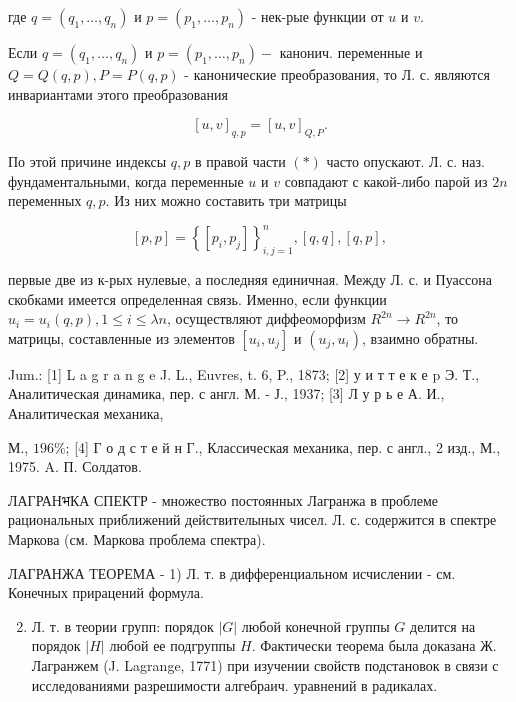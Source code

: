 \documentclass[10pt]{article}
\begin{document}
где $q=\left(q_{1}, \ldots, q_{n}\right)$ и $p=\left(p_{1}, \ldots, p_{n}\right)$ - нек-рые функции от $u$ и $v$.



Если $q=\left(q_{1}, \ldots, q_{n}\right)$ и $p=\left(p_{1}, \ldots, p_{n}\right)-$ канонич. переменные и $Q=Q(q, p), P=P(q, p)$ - канонические преобразования, то Л. с. являются инвариантами этого преобразования



\[

[u, v]_{q, p}=[u, v]_{Q, P} .

\]



По этой причине индексы $q, p$ в правой части $(*)$ часто опускают. Л. с. наз. фундаментальными, когда переменные $u$ и $v$ совпадают с какой-либо парой из $2 n$ переменных $q, p$. Из них можно составить три матрицы



\[

[p, p]=\left\{\left[p_{i}, p_{j}\right]\right\}_{i, j=1}^{n},[q, q],[q, p],

\]



первые две из к-рых нулевые, а последняя единичная. Между Л. с. и Пуассона скобками имеется определенная связь. Именно, если функции $u_{i}=u_{i}(q, p), 1 \leqslant i \leqslant \lambda n$, осуществляют диффеоморфизм $R^{2 n} \rightarrow R^{2 n}$, то матрицы, составленные из элементов $\left[u_{i}, u_{j}\right]$ и $\left(u_{j}, u_{i}\right)$, взаимно обратны.



Jum.: [1] L a g r a n g e J. L., Euvres, t. 6, P., 1873; [2] у и т т е к е p Э. Т., Аналитическая динамика, пер. с англ. М. - Ј., 1937; [3] Л у р ь е А. И., Аналитическая механика,

М., $196 \%$; [4] Г о д с т е й н Г., Классическая механика, пер. с англ., 2 изд., М., 1975. A. П. Солдатов.



ЛАГРАНभКА СПЕКТР - множество постоянных Лагранжа в проблеме рациональных приближений действителыных чисел. Л. с. содержится в спектре Маркова (см. Маркова проблема спектра).



ЛАГРАНЖА ТЕОРЕМА - 1) Л. т. в дифференциальном исчислении - см. Конечных прирацений формула.



\begin{enumerate}

  \setcounter{enumi}{1}

  \item Л. т. в теории групп: порядок $|G|$ любой конечной группы $G$ делится на порядок $|H|$ любой ее подгруппы $H$. Фактически теорема была доказана Ж. Лагранжем (J. Lagrange, 1771) при изучении свойств подстановок в связи с исследованиями разрешимости алгебраич. уравнений в радикалах.

\end{enumerate}
\end{document}
